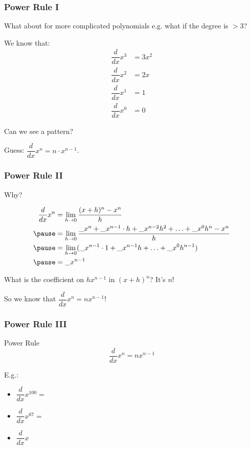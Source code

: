 \documentclass{ltx-talk}
\begin{document}
\begin{frame}
  \frametitle{Power Rule I}

  What about for more complicated polynomials \pause e.g. what if the degree is $> 3$? \pause

  We know that:
  \begin{align}
    \dfrac{d}{dx} x^3 &= 3x^2 \\
    \dfrac{d}{dx} x^2 &= 2x \\
    \dfrac{d}{dx} x^1 &= 1 \\
    \dfrac{d}{dx} x^0 &= 0
  \end{align} \pause

  Can we see a pattern? \pause

  Guess: $\dfrac{d}{dx} x^n = n \cdot x^{n - 1}$.
\end{frame}

\begin{frame}
  \frametitle{Power Rule II}

  Why?

  \begin{align}
    \dfrac{d}{dx} x^n &= \lim\limits_{h \rightarrow 0} \dfrac{(x + h)^n - x^n}{h} \\ \pause
                      &= \lim\limits_{h \rightarrow 0} \dfrac{\_ x^n + \_ x^{n-1} \cdot h + \_ x^{n-2} h^2 + \ldots + \_ x^0 h^n - x^n}{h} \\ \pause
                      &= \lim\limits_{h \rightarrow 0} (\_ x^{n - 1} \cdot 1 + \_ x^{n - 1} h + \ldots + \_ x^0 h^{n - 1}) \\ \pause
                      &= \_ x^{n-1}
  \end{align} \pause

  What is the coefficient on $hx^{n-1}$ in $(x + h)^n$? \pause It's $n$! \pause

  So we know that $\dfrac{d}{dx} x^n = n x^{n - 1}$!
\end{frame}

\begin{frame}
  \frametitle{Power Rule III}

  \begin{block}{Power Rule}
    \begin{equation}
      \dfrac{d}{dx} x^n = nx^{n-1}
    \end{equation}
  \end{block} \pause

  E.g.: \pause
  \begin{itemize}
    \item $\dfrac{d}{dx} x^{100} = $ \pause
    \item $\dfrac{d}{dx} x^{67} = $ \pause
    \item $\dfrac{d}{dx} x$ 
  \end{itemize}
\end{frame}
\end{document}
